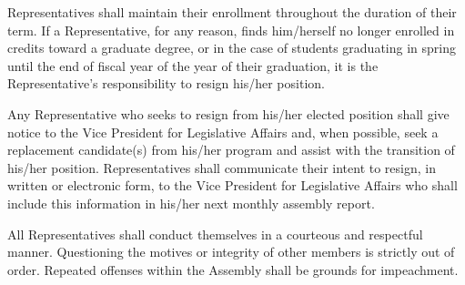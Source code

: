 \begin{bylaws-number}
  \item Representatives shall maintain their enrollment throughout the duration of their term. If a Representative, for any reason, finds him/herself no longer enrolled in credits toward a graduate degree, or in the case of students graduating in spring until the end of fiscal year of the year of their graduation, it is the Representative’s responsibility to resign his/her position.
  \item Any Representative who seeks to resign from his/her elected position shall give notice to the Vice President for Legislative Affairs and, when possible, seek a replacement candidate(s) from his/her program and assist with the transition of his/her position. Representatives shall communicate their intent to resign, in written or electronic form, to the Vice President for Legislative Affairs who shall include this information in his/her next monthly assembly report.
  \item All Representatives shall conduct themselves in a courteous and respectful manner. Questioning the motives or integrity of other members is strictly out of order. Repeated offenses within the Assembly shall be grounds for impeachment.
\end{bylaws-number}

